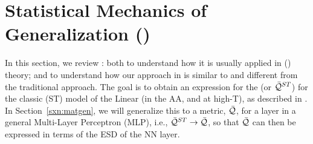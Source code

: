 \section{Statistical Mechanics of Generalization (\SMOG)}
\label{sxn:SMOG_main}

In this section, we review \STATMECH: 
both to understand how it is usually applied in \StatisticalMechanicsOfGeneralization (\SMOG) theory; 
and to understand how our \SemiEmpirical approach in \SETOL is similar to and different from the traditional approach.
The goal is to obtain an expression for the \GeneralizationAccuracy (or \ModelQuality $\bar{\mathcal{Q}}^{ST}$) for the
classic \StudentTeacher (ST) model of the Linear \Perceptron (in the AA, and at high-T),
as described in \cite{SST90,SST92}.
In Section~\ref{sxn:matgen}, we will generalize this to a \LayerQuality metric, $\bar{\mathcal{Q}}$, for a layer in a general Multi-Layer Perceptron (MLP),
i.e., $\bar{\mathcal{Q}}^{ST}\rightarrow\bar{\mathcal{Q}}$, so that $\bar{\mathcal{Q}}$ can then be expressed in terms of the ESD of the NN layer.

